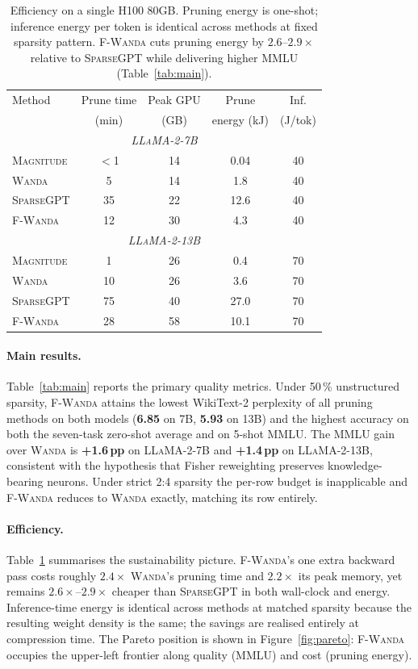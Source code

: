 \documentclass[11pt]{article}
\newcommand{\fwanda}{\textsc{F-Wanda}}
\newcommand{\wanda}{\textsc{Wanda}}
\newcommand{\sgpt}{\textsc{SparseGPT}}
\newcommand{\mag}{\textsc{Magnitude}}
\begin{document}
\begin{table}[t]
\centering
\small
\setlength{\tabcolsep}{4pt}
\begin{tabular}{lcccc}
\toprule
Method & Prune time & Peak GPU & Prune & Inf. \\
       & (min)      & (GB)     & energy (kJ) & (J/tok) \\
\midrule
\multicolumn{5}{c}{\textit{\textsc{LLaMA-2-7B}}} \\
\mag    & $<$1 & 14 & 0.04 & 40 \\
\wanda  & 5    & 14 & 1.8 & 40 \\
\sgpt   & 35   & 22 & 12.6 & 40 \\
\fwanda & 12   & 30 & 4.3 & 40 \\
\midrule
\multicolumn{5}{c}{\textit{\textsc{LLaMA-2-13B}}} \\
\mag    & 1   & 26 & 0.4 & 70 \\
\wanda  & 10  & 26 & 3.6 & 70 \\
\sgpt   & 75  & 40 & 27.0 & 70 \\
\fwanda & 28  & 58 & 10.1 & 70 \\
\bottomrule
\end{tabular}
\caption{Efficiency on a single H100 80GB. Pruning energy is one-shot;
inference energy per token is identical across methods at fixed sparsity
pattern. \fwanda{} cuts pruning energy by $2.6$--$2.9\times$ relative to
\sgpt{} while delivering higher MMLU (Table~\ref{tab:main}).}
\label{tab:efficiency}
\end{table}

\paragraph{Main results.}
Table~\ref{tab:main} reports the primary quality metrics. Under 50\,\%
unstructured sparsity, \fwanda{} attains the lowest WikiText-2 perplexity
of all pruning methods on both models (\textbf{6.85} on 7B,
\textbf{5.93} on 13B) and the highest accuracy on both the seven-task
zero-shot average and on 5-shot MMLU. The MMLU gain over \wanda{} is
\textbf{+1.6\,pp} on \textsc{LLaMA-2-7B} and \textbf{+1.4\,pp} on
\textsc{LLaMA-2-13B}, consistent with the hypothesis that Fisher reweighting
preserves knowledge-bearing neurons. Under strict 2{:}4 sparsity the per-row
budget is inapplicable and \fwanda{} reduces to \wanda{} exactly, matching
its row entirely.

\paragraph{Efficiency.}
Table~\ref{tab:efficiency} summarises the sustainability picture.
\fwanda's one extra backward pass costs roughly $2.4\times$ \wanda's
pruning time and $2.2\times$ its peak memory, yet remains
$2.6\times$--$2.9\times$ cheaper than \sgpt{} in both wall-clock and
energy. Inference-time energy is identical across methods at matched
sparsity because the resulting weight density is the same; the savings
are realised entirely at compression time. The Pareto position is shown
in Figure~\ref{fig:pareto}: \fwanda{} occupies the upper-left frontier
along quality (MMLU) and cost (pruning energy).
\end{document}
